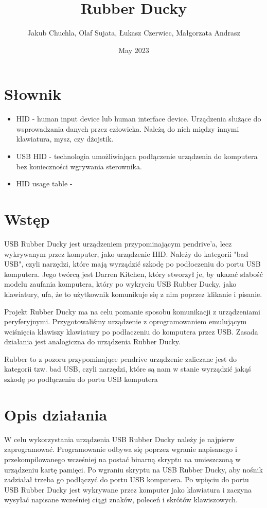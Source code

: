 \documentclass{article}
\title{Rubber Ducky}
\author{Jakub Chuchla, Olaf Sujata, Łukasz Czerwiec, Małgorzata Andrasz}
\date{May 2023}
\begin{document}
\maketitle

\tableofcontents

\section{Słownik}
\begin{itemize}
    \item HID - human input device lub human interface device. Urządzenia służące do wsprowadzania danych przez człowieka. Należą do nich między innymi klawiatura, mysz, czy dżojstik.
    \item USB HID - technologia umożliwiająca podłączenie urządzenia do komputera bez konieczności wgrywania sterownika.
    \item HID usage table - 
\end{itemize}

\section{Wstęp}

USB Rubber Ducky jest urządzeniem przypominającym pendrive'a, lecz wykrywanym przez komputer, jako urządzenie HID. Należy do kategorii "bad USB", czyli narzędzi, które mają wyrządzić szkodę po podłoczeniu do portu USB komputera. Jego twórcą jest Darren Kitchen, który stworzył je, by ukazać słabość modelu zaufania komputera, który po wykryciu USB Rubber Ducky, jako klawiatury, ufa, że to użytkownik komunikuje się z nim poprzez klikanie i pisanie.

Projekt Rubber Ducky ma na celu poznanie sposobu komunikacji z urządzeniami peryferyjnymi. Przygotowaliśmy urządzenie z oprogramowaniem emulującym wciśnięcia klawiszy klawiatury po podłaczeniu do komputera przez USB. Zasada działania jest analogiczna do urządzenia Rubber Ducky. 

Rubber to z pozoru przypominające pendrive urządzenie zaliczane jest do kategorii tzw. bad USB, czyli narzędzi, które są nam w stanie wyrządzić jakąś szkodę po podłączeniu do portu USB komputera

\section{Opis działania}

W celu wykorzystania urządzenia USB Rubber Ducky należy je najpierw zaprogramować. Programowanie odbywa się poprzez wgranie napisanego i przekompilowanego wcześniej na postać binarną skryptu na umieszczoną w urządzeniu kartę pamięci. Po wgraniu skryptu na USB Rubber Ducky, aby nośnik zadziałał trzeba go podłączyć do portu USB komputera. Po wpięciu do portu USB Rubber Ducky jest wykrywane przez komputer jako klawiatura i zaczyna wysyłać napisane wcześniej ciągi znaków, poleceń i skrótów klawiszowych.
\end{document}
